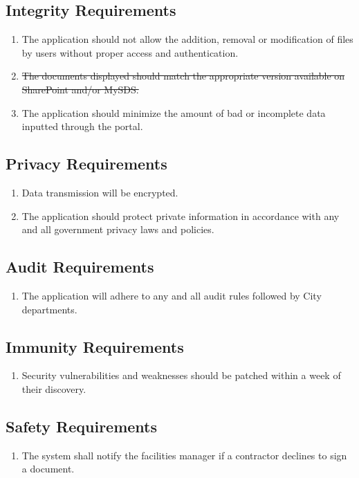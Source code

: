 \documentclass[12pt]{article}
\begin{document}
\subsection{Integrity Requirements}
\begin{enumerate} [{SR-IR}1.]
  \item The application should not allow the addition, removal or modification
    of files by users without proper access and authentication.
  \item \sout{The documents displayed should match the appropriate version available
    on SharePoint and/or MySDS.}
  \item The application should minimize the amount of bad or incomplete data
    inputted through the portal.
\end{enumerate}
\subsection{Privacy Requirements}
\begin{enumerate} [{SR-PR}1.]
  \item Data transmission will be encrypted.
  \item The application should protect private information in accordance with
    any and all government privacy laws and policies.
\end{enumerate}
\subsection{Audit Requirements}
\begin{enumerate} [{SR-AU}1.]
  \item The application will adhere to any and all audit rules followed by City
    departments.
\end{enumerate}
\subsection{Immunity Requirements}
\begin{enumerate} [{SR-IMR}1.]
  \item Security vulnerabilities and weaknesses should be patched
    within a week of their discovery.
\end{enumerate}
\subsection{Safety Requirements}
\begin{enumerate}[{SR-S}1.]
  \item The system shall notify the facilities manager if a contractor declines
    to sign a document.
\end{enumerate}
\end{document}
